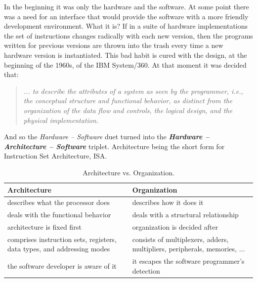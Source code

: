 \bigskip
In the beginning it was only the hardware and the software. At some point there was a need for an interface that would provide the software with a more friendly development environment. What it is? If in a suite of hardware implementations the set of instructions changes radically with each new version, then the programs written for previous versions are thrown into the trash every time a new hardware version is instantiated. This bad habit is cured with the design, at the beginning of the 1960s, of the IBM System/360. At that moment it was decided that:
\begin{quote}
{\em ... to describe the
attributes of a system as seen by the programmer, i.e., the conceptual structure
and functional behavior, as distinct from the organization of the data flow and
controls, the logical design, and the physical implementation.} \citep{Amdahl64}
\end{quote}
And so the {\em Hardware -- Software} duet turned into the {\bf {\em Hardware -- Architecture -- Software}} triplet. Architecture being the short form for Instruction Set Architecture, ISA.
\begin{table}[H]
  \begin{center}
    \caption{Architecture vs. Organization.}
    \label{avso}
    {\small
    \begin{tabular}{|p{6cm}|p{6cm}|}
      \hline
     {\bf Architecture}                 & {\bf Organization}                                \\ \hline \hline
     describes what the processor does   & describes how it does it                          \\ \hline
     deals with the functional behavior & deals with a structural relationship              \\ \hline
     architecture is fixed first        & organization is decided after     \\ \hline
     comprises instruction sets, registers, data types, and addressing modes & consists of  multiplexers, adders, multipliers, peripherals, memories, ...\\ \hline
     the software developer is aware of it & it escapes the software programmer’s detection\\ \hline
    \end{tabular}
    }
  \end{center}
\end{table}


